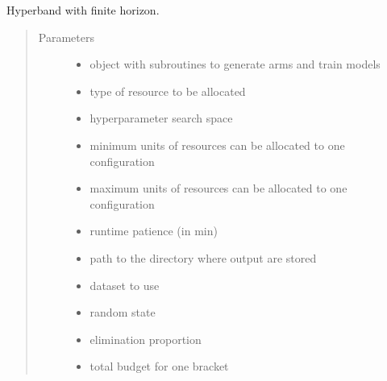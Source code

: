 \documentclass[letterpaper,10pt,english]{sphinxmanual}
\begin{document}
\begin{fulllineitems}
\label{\detokenize{index:heuristics.hyperloop.hyperloop_finite}}
Hyperband with finite horizon.
\begin{quote}\begin{description}
\item[{Parameters}] \leavevmode\begin{itemize}
\item {} 
 \textendash{} object with subroutines to generate arms and train models

\item {} 
 \textendash{} type of resource to be allocated

\item {} 
 \textendash{} hyperparameter search space

\item {} 
 \textendash{} minimum units of resources can be allocated to one configuration

\item {} 
 \textendash{} maximum units of resources can be allocated to one configuration

\item {} 
 \textendash{} runtime patience (in min)

\item {} 
 \textendash{} path to the directory where output are stored

\item {} 
 \textendash{} dataset to use

\item {} 
 \textendash{} random state

\item {} 
 \textendash{} elimination proportion

\item {} 
 \textendash{} total budget for one bracket


\end{itemize}
\end{description}
\end{quote}
\end{fulllineitems}
\end{document}
